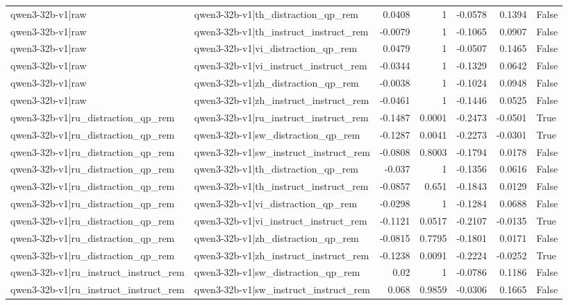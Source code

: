 \begin{table}
\begin{tabular}{l l r r r r l}
qwen3-32b-v1|raw & qwen3-32b-v1|th_distraction_qp_rem & 0.0408 & 1 & -0.0578 & 0.1394 & False \\
qwen3-32b-v1|raw & qwen3-32b-v1|th_instruct_instruct_rem & -0.0079 & 1 & -0.1065 & 0.0907 & False \\
qwen3-32b-v1|raw & qwen3-32b-v1|vi_distraction_qp_rem & 0.0479 & 1 & -0.0507 & 0.1465 & False \\
qwen3-32b-v1|raw & qwen3-32b-v1|vi_instruct_instruct_rem & -0.0344 & 1 & -0.1329 & 0.0642 & False \\
qwen3-32b-v1|raw & qwen3-32b-v1|zh_distraction_qp_rem & -0.0038 & 1 & -0.1024 & 0.0948 & False \\
qwen3-32b-v1|raw & qwen3-32b-v1|zh_instruct_instruct_rem & -0.0461 & 1 & -0.1446 & 0.0525 & False \\
qwen3-32b-v1|ru_distraction_qp_rem & qwen3-32b-v1|ru_instruct_instruct_rem & -0.1487 & 0.0001 & -0.2473 & -0.0501 & True \\
qwen3-32b-v1|ru_distraction_qp_rem & qwen3-32b-v1|sw_distraction_qp_rem & -0.1287 & 0.0041 & -0.2273 & -0.0301 & True \\
qwen3-32b-v1|ru_distraction_qp_rem & qwen3-32b-v1|sw_instruct_instruct_rem & -0.0808 & 0.8003 & -0.1794 & 0.0178 & False \\
qwen3-32b-v1|ru_distraction_qp_rem & qwen3-32b-v1|th_distraction_qp_rem & -0.037 & 1 & -0.1356 & 0.0616 & False \\
qwen3-32b-v1|ru_distraction_qp_rem & qwen3-32b-v1|th_instruct_instruct_rem & -0.0857 & 0.651 & -0.1843 & 0.0129 & False \\
qwen3-32b-v1|ru_distraction_qp_rem & qwen3-32b-v1|vi_distraction_qp_rem & -0.0298 & 1 & -0.1284 & 0.0688 & False \\
qwen3-32b-v1|ru_distraction_qp_rem & qwen3-32b-v1|vi_instruct_instruct_rem & -0.1121 & 0.0517 & -0.2107 & -0.0135 & True \\
qwen3-32b-v1|ru_distraction_qp_rem & qwen3-32b-v1|zh_distraction_qp_rem & -0.0815 & 0.7795 & -0.1801 & 0.0171 & False \\
qwen3-32b-v1|ru_distraction_qp_rem & qwen3-32b-v1|zh_instruct_instruct_rem & -0.1238 & 0.0091 & -0.2224 & -0.0252 & True \\
qwen3-32b-v1|ru_instruct_instruct_rem & qwen3-32b-v1|sw_distraction_qp_rem & 0.02 & 1 & -0.0786 & 0.1186 & False \\
qwen3-32b-v1|ru_instruct_instruct_rem & qwen3-32b-v1|sw_instruct_instruct_rem & 0.068 & 0.9859 & -0.0306 & 0.1665 & False \\

\end{tabular}
\end{table}
